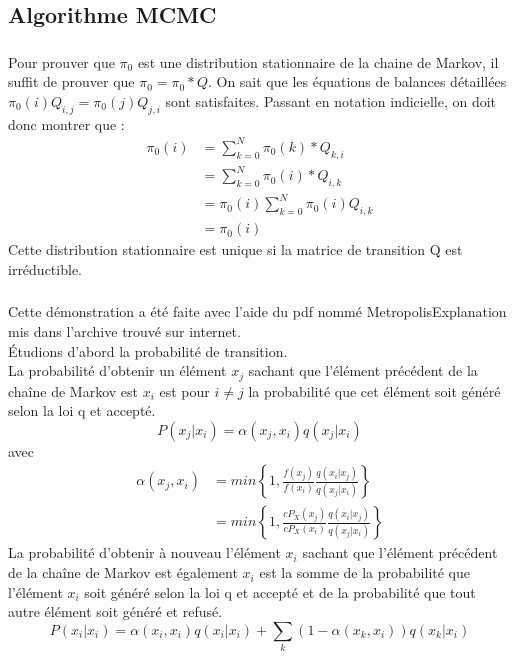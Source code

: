 \documentclass[11pt]{report}
\begin{document}
\subsection{Algorithme MCMC}
\subsubsection{}
Pour prouver que $\pi_0$ est une distribution stationnaire de la chaine de Markov, il suffit de prouver que $\pi_0=\pi_0 *Q$. 
On sait que les équations de balances détaillées $\pi_0(i)Q_{i,j} = \pi_0(j)Q_{j,i}$ sont satisfaites.
Passant en notation indicielle, on doit donc montrer que :
\begin{align*}
\pi_0(i) &= \sum^{N}_{k=0} \pi_0(k)*Q_{k,i} \\
& = \sum^{N}_{k=0} \pi_0(i)*Q_{i,k} \\
& = \pi_0(i) \sum^{N}_{k=0} \pi_0(i) Q_{i,k} \\
& = \pi_0(i)
\end{align*}
Cette distribution stationnaire est unique si la matrice de transition Q est irréductible.
\subsubsection{}
Cette démonstration a été faite avec l'aide du pdf nommé MetropolisExplanation mis dans l'archive trouvé sur internet.\\
Étudions d'abord la probabilité de transition.\\
La probabilité d'obtenir un élément $x_j$ sachant que l'élément précédent de la chaîne de Markov est $x_i$ est pour $i \neq j$ la probabilité que cet élément soit généré selon la loi q et accepté.
$$P(x_j | x_i) = \alpha(x_j, x_i) q(x_j| x_i)$$
avec
\begin{align*}
\alpha(x_j, x_i) 
&= min \left\{1, \frac{f(x_j)}{f(x_i)} \frac{q(x_i|x_j)}{q(x_j|x_i)}\right\}\\
&= min \left\{1, \frac{cP_X(x_j)}{cP_X(x_i)} \frac{q(x_i|x_j)}{q(x_j|x_i)}\right\}
\end{align*}
La probabilité d'obtenir à nouveau l'élément $x_i$ sachant que l'élément précédent de la chaîne de Markov est également $x_i$ est la somme de la probabilité que l'élément $x_i$ soit généré selon la loi q et accepté et de la probabilité que tout autre élément soit généré et refusé.
$$P(x_i | x_i) = \alpha(x_i, x_i) q(x_i|x_i) + \sum_k (1-\alpha(x_k, x_i)) q(x_k |x_i)$$
\end{document}
